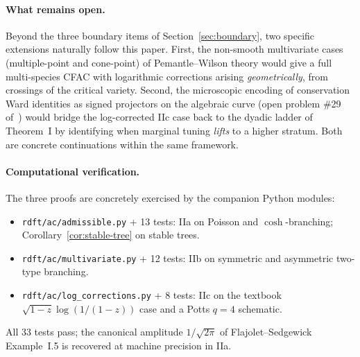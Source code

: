 \documentclass[11pt,a4paper]{article}
\theoremstyle{plain}
\theoremstyle{definition}
\begin{document}
\paragraph{What remains open.}
Beyond the three boundary items of Section~\ref{sec:boundary}, two
specific extensions naturally follow this paper.  First, the
non-smooth multivariate cases (multiple-point and cone-point) of
Pemantle--Wilson theory would give a full multi-species CFAC with
logarithmic corrections arising \emph{geometrically}, from crossings
of the critical variety.  Second, the microscopic encoding of
conservation Ward identities as signed projectors on the algebraic
curve (open problem \#29 of~\citep{AmarteifioProblems2026}) would
bridge the log-corrected IIc case back to the dyadic ladder of
Theorem~I by identifying when marginal tuning \emph{lifts} to a
higher stratum.  Both are concrete continuations within the same
framework.

\paragraph{Computational verification.}
The three proofs are concretely exercised by the companion Python
modules:
\begin{itemize}[leftmargin=1.2em, itemsep=1pt]
  \item \texttt{rdft/ac/admissible.py} + 13 tests: IIa on Poisson
    and $\cosh$-branching; Corollary~\ref{cor:stable-tree} on stable
    trees.
  \item \texttt{rdft/ac/multivariate.py} + 12 tests: IIb on
    symmetric and asymmetric two-type branching.
  \item \texttt{rdft/ac/log\_corrections.py} + 8 tests: IIc on the
    textbook $\sqrt{1-z}\log(1/(1-z))$ case and a Potts $q=4$
    schematic.
\end{itemize}
All 33 tests pass; the canonical amplitude $1/\sqrt{2\pi}$ of
Flajolet--Sedgewick Example~I.5 is recovered at machine precision
in IIa.
\end{document}
